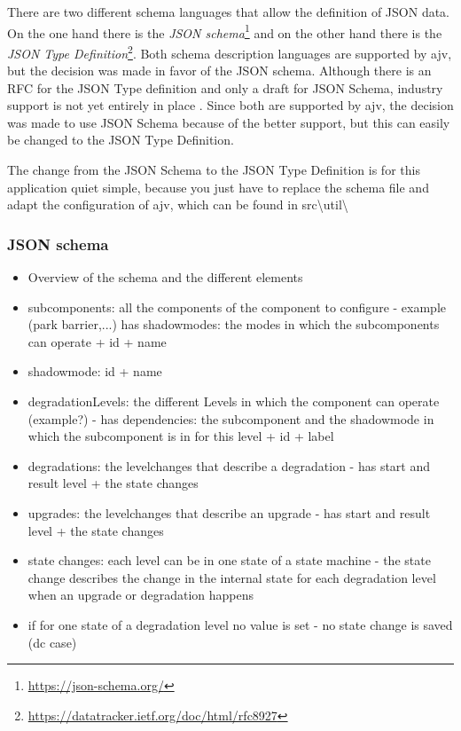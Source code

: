 There are two different schema languages that allow the definition of JSON data. On the one hand there is the \textit{JSON schema}\footnote{\url{https://json-schema.org/}} and on the other hand there is the \textit{JSON Type Definition}\footnote{\url{https://datatracker.ietf.org/doc/html/rfc8927}}. Both schema description languages are supported by ajv, but the decision was made in favor of the JSON schema. Although there is an RFC for the JSON Type definition and only a draft for JSON Schema, industry support is not yet entirely in place \cite{ajv_comparison}. Since both are supported by ajv, the decision was made to use JSON Schema because of the better support, but this can easily be changed to the JSON Type Definition.

The change from the JSON Schema to the JSON Type Definition is for this application quiet simple, because you just have to replace the schema file and adapt the configuration of ajv, which can be found in src\textbackslash util\textbackslash

\subsubsection{JSON schema}
\begin{itemize}
    \item Overview of the schema and the different elements
    \item subcomponents: all the components of the component to configure - example (park barrier,...) has shadowmodes: the modes in which the subcomponents can operate + id + name
    \item shadowmode: id + name
    \item degradationLevels: the different Levels in which the component can operate (example?) - has dependencies: the subcomponent and the shadowmode in which the subcomponent is in for this level + id + label
    \item degradations: the levelchanges that describe a degradation - has start and result level + the state changes 
    \item upgrades: the levelchanges that describe an upgrade - has start and result level + the state changes 
    \item state changes: each level can be in one state of a state machine - the state change describes the change in the internal state for each degradation level when an upgrade or degradation happens
    \item if for one state of a degradation level no value is set - no state change is saved (dc case)
\end{itemize}


